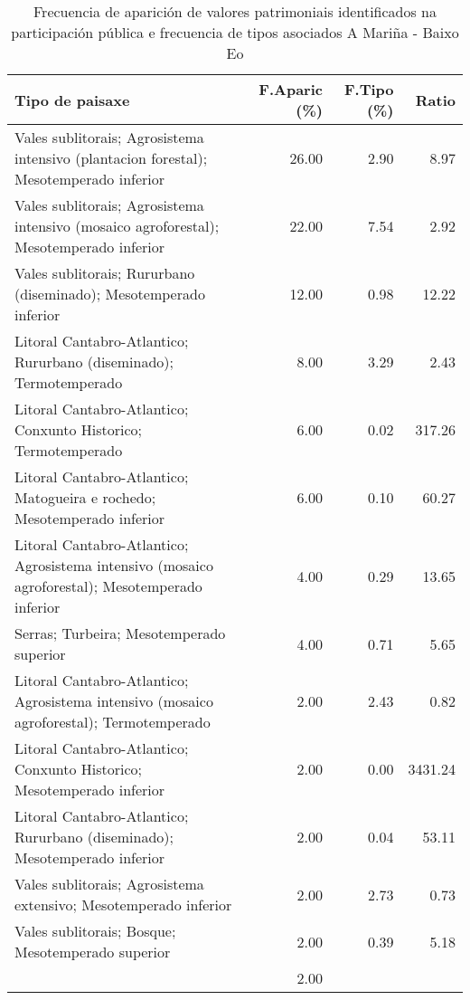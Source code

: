 \begin{table}[p]
\centering
\caption{Frecuencia de aparición de valores patrimoniais identificados na participación pública e frecuencia de tipos asociados A Mariña - Baixo Eo} 
\label{vsixotpat2}
\begin{tabular}{lrrr}
  \hline
Tipo de paisaxe & F.Aparic (\%) & F.Tipo (\%) & Ratio \\ 
  \hline
Vales sublitorais; Agrosistema intensivo (plantacion forestal); Mesotemperado inferior & 26.00 & 2.90 & 8.97 \\ 
  Vales sublitorais; Agrosistema intensivo (mosaico agroforestal); Mesotemperado inferior & 22.00 & 7.54 & 2.92 \\ 
  Vales sublitorais; Rururbano (diseminado); Mesotemperado inferior & 12.00 & 0.98 & 12.22 \\ 
  Litoral Cantabro-Atlantico; Rururbano (diseminado); Termotemperado & 8.00 & 3.29 & 2.43 \\ 
  Litoral Cantabro-Atlantico; Conxunto Historico; Termotemperado & 6.00 & 0.02 & 317.26 \\ 
  Litoral Cantabro-Atlantico; Matogueira e rochedo; Mesotemperado inferior & 6.00 & 0.10 & 60.27 \\ 
  Litoral Cantabro-Atlantico; Agrosistema intensivo (mosaico agroforestal); Mesotemperado inferior & 4.00 & 0.29 & 13.65 \\ 
  Serras; Turbeira; Mesotemperado superior & 4.00 & 0.71 & 5.65 \\ 
  Litoral Cantabro-Atlantico; Agrosistema intensivo (mosaico agroforestal); Termotemperado & 2.00 & 2.43 & 0.82 \\ 
  Litoral Cantabro-Atlantico; Conxunto Historico; Mesotemperado inferior & 2.00 & 0.00 & 3431.24 \\ 
  Litoral Cantabro-Atlantico; Rururbano (diseminado); Mesotemperado inferior & 2.00 & 0.04 & 53.11 \\ 
  Vales sublitorais; Agrosistema extensivo; Mesotemperado inferior & 2.00 & 2.73 & 0.73 \\ 
  Vales sublitorais; Bosque; Mesotemperado superior & 2.00 & 0.39 & 5.18 \\ 
   & 2.00 &  &  \\ 
   \hline
\end{tabular}
\end{table}
